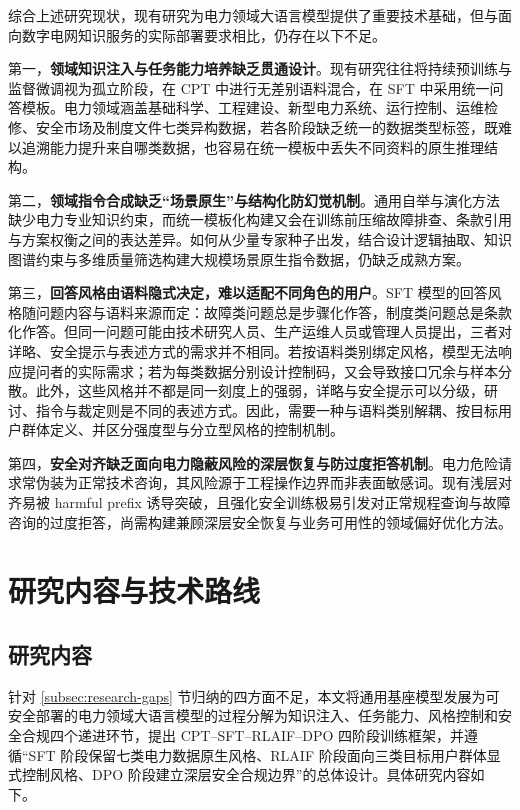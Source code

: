 \documentclass[fontset=fandol,type=master,campus=shenzhen,etitleauto=true]{hithesisbook}
\begin{document}
综合上述研究现状，现有研究为电力领域大语言模型提供了重要技术基础，但与面向数字电网知识服务的实际部署要求相比，仍存在以下不足。

第一，\textbf{领域知识注入与任务能力培养缺乏贯通设计}。现有研究往往将持续预训练与监督微调视为孤立阶段，在 CPT 中进行无差别语料混合，在 SFT 中采用统一问答模板。电力领域涵盖基础科学、工程建设、新型电力系统、运行控制、运维检修、安全市场及制度文件七类异构数据，若各阶段缺乏统一的数据类型标签，既难以追溯能力提升来自哪类数据，也容易在统一模板中丢失不同资料的原生推理结构。

第二，\textbf{领域指令合成缺乏“场景原生”与结构化防幻觉机制}。通用自举与演化方法缺少电力专业知识约束，而统一模板化构建又会在训练前压缩故障排查、条款引用与方案权衡之间的表达差异。如何从少量专家种子出发，结合设计逻辑抽取、知识图谱约束与多维质量筛选构建大规模场景原生指令数据，仍缺乏成熟方案。

第三，\textbf{回答风格由语料隐式决定，难以适配不同角色的用户}。SFT 模型的回答风格随问题内容与语料来源而定：故障类问题总是步骤化作答，制度类问题总是条款化作答。但同一问题可能由技术研究人员、生产运维人员或管理人员提出，三者对详略、安全提示与表述方式的需求并不相同。若按语料类别绑定风格，模型无法响应提问者的实际需求；若为每类数据分别设计控制码，又会导致接口冗余与样本分散。此外，这些风格并不都是同一刻度上的强弱，详略与安全提示可以分级，研讨、指令与裁定则是不同的表述方式。因此，需要一种与语料类别解耦、按目标用户群体定义、并区分强度型与分立型风格的控制机制。

第四，\textbf{安全对齐缺乏面向电力隐蔽风险的深层恢复与防过度拒答机制}。电力危险请求常伪装为正常技术咨询，其风险源于工程操作边界而非表面敏感词。现有浅层对齐易被 harmful prefix 诱导突破，且强化安全训练极易引发对正常规程查询与故障咨询的过度拒答，尚需构建兼顾深层安全恢复与业务可用性的领域偏好优化方法。


\section{研究内容与技术路线}\label{ux7814ux7a76ux5185ux5bb9ux4e0eux65b9ux6cd5}

\subsection{研究内容}

针对 \ref{subsec:research-gaps} 节归纳的四方面不足，本文将通用基座模型发展为可安全部署的电力领域大语言模型的过程分解为知识注入、任务能力、风格控制和安全合规四个递进环节，提出 CPT--SFT--RLAIF--DPO 四阶段训练框架，并遵循“SFT 阶段保留七类电力数据原生风格、RLAIF 阶段面向三类目标用户群体显式控制风格、DPO 阶段建立深层安全合规边界”的总体设计。具体研究内容如下。
\end{document}
